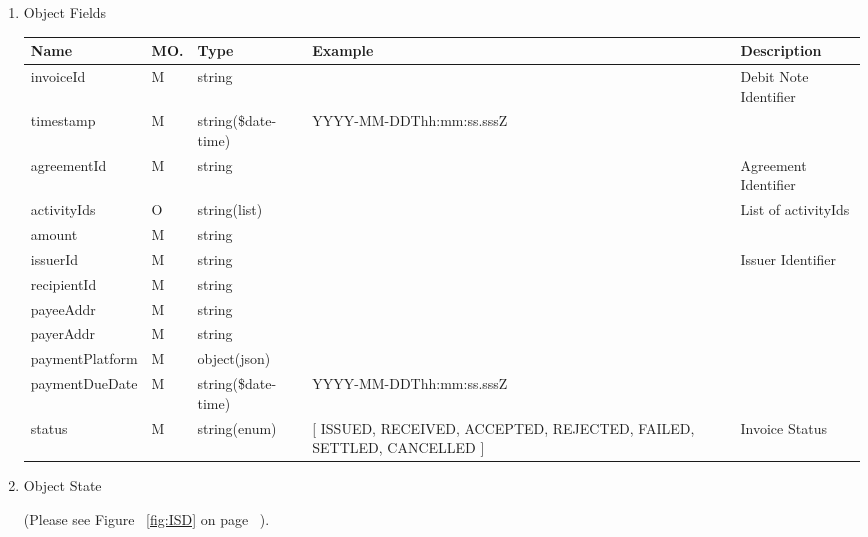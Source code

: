 \begin{enumerate}
\begin{enumerate}
\item Object Fields

\begin{center}
\begin{tabular}{|p{3cm}|l|p{3cm}|p{3cm}|p{4cm}|} 
\hline
\rowcolor{lightgray}	Name	& MO.	& Type	& Example & 	Description \\
\hline

invoiceId	 			& M & string 				&  							&  Debit Note Identifier \\
\hline	

timestamp 				& M & string(\$date-time) 	&  YYYY-MM-DDThh:mm:ss.sssZ	&  \\
\hline

agreementId				& M & string 				&  							&  Agreement Identifier \\
\hline	

activityIds				& O & string(list)			&							& List of activityIds \\
\hline

amount	 				& M & string 				&  							&   \\
\hline

issuerId				& M &  string				&							& Issuer Identifier \\
\hline

recipientId				& M & string 				&  							&   \\
\hline

payeeAddr				& M & string 				&  							&   \\
\hline

payerAddr				& M & string 				&  							&   \\
\hline

paymentPlatform			& M & object(json) 			&  							&   \\
\hline

paymentDueDate			& M & string(\$date-time) 	&  YYYY-MM-DDThh:mm:ss.sssZ	&  \\
\hline

status					& M & string(enum)			& [ ISSUED, RECEIVED, ACCEPTED, REJECTED, FAILED, SETTLED, CANCELLED ] & Invoice Status \\
\hline
			
\end{tabular}
\end{center}

\item Object State

(Please see Figure ~\ref{fig:ISD} on page ~\pageref{fig:ISD}).


\end{enumerate}
\end{enumerate}
